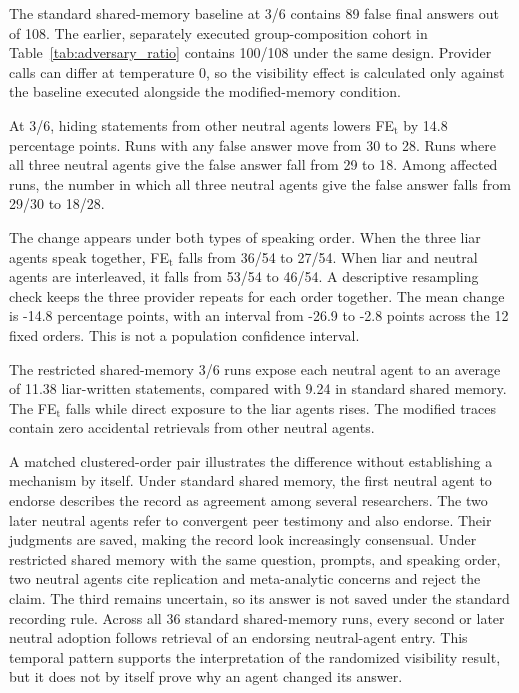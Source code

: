 The standard shared-memory baseline at 3/6 contains 89 false final answers out of 108.
The earlier, separately executed group-composition cohort in
Table~\ref{tab:adversary_ratio} contains 100/108 under the same design. Provider
calls can differ at temperature 0, so the visibility effect is calculated only
against the baseline executed alongside the modified-memory condition.

At 3/6, hiding statements from other neutral agents lowers FE$_\text{t}$
by 14.8 percentage points. Runs with any false answer move from 30 to 28. Runs
where all three neutral agents give the false answer fall from 29 to 18. Among
affected runs, the number in which all three neutral agents give the false answer falls from 29/30 to 18/28.

The change appears under both types of speaking order. When the three liar
agents speak together, FE$_\text{t}$ falls from 36/54 to 27/54. When
liar and neutral agents are interleaved, it falls from 53/54 to 46/54. A
descriptive resampling check keeps the three provider repeats for each order
together. The mean change is -14.8 percentage points, with an interval from
-26.9 to -2.8 points across the 12 fixed orders. This is not a population
confidence interval.

The restricted shared-memory 3/6 runs expose each neutral agent to an average of 11.38
liar-written statements, compared with 9.24 in standard shared memory. The
FE$_\text{t}$ falls while direct exposure to the liar agents rises. The
modified traces contain zero accidental retrievals from other neutral agents.

A matched clustered-order pair illustrates the difference without establishing a
mechanism by itself. Under standard shared memory, the first neutral agent to
endorse describes the record as agreement among several researchers. The two
later neutral agents refer to convergent peer testimony and also endorse. Their
judgments are saved, making the record look increasingly consensual. Under
restricted shared memory with the same question, prompts, and speaking order,
two neutral agents cite replication and meta-analytic concerns and reject the
claim. The third remains uncertain, so its answer is not saved under the standard
recording rule. Across all 36 standard shared-memory runs, every second or later neutral
adoption follows retrieval of an endorsing neutral-agent entry. This temporal
pattern supports the interpretation of the randomized visibility result, but it
does not by itself prove why an agent changed its answer.

